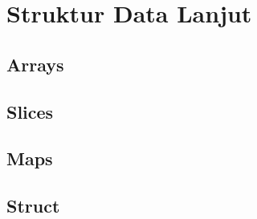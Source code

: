 \chapter{Struktur Data Lanjut}

\section{Arrays}

\section{Slices}

\section{Maps}

\section{Struct}

